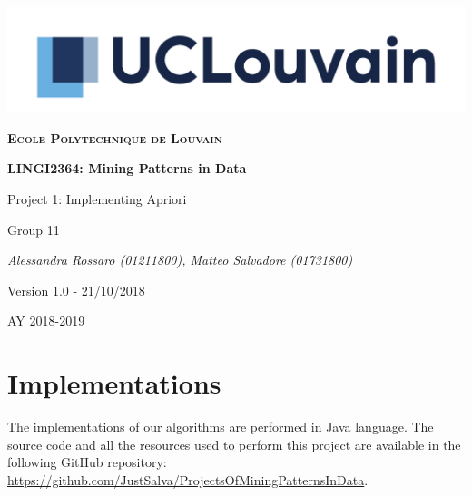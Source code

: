 \documentclass[11pt, a4paper]{article}
\begin{document}
	\begin{titlepage}
		\centering
		\includegraphics[scale =0.8]{logo.jpg}\par\vspace{1cm}
		{\scshape\LARGE\bfseries Ecole Polytechnique de Louvain\par}
		\vspace{1.5cm}
		{\scshape\Large \par}
		\vspace{1.5cm}
		{\huge\bfseries LINGI2364: Mining Patterns in Data \par}
		\vspace{1cm}
		{\Huge Project 1: Implementing Apriori \par}
		\vspace{2cm}
		{\LARGE Group 11\par}
		\vspace{1cm}
		{\Large\itshape Alessandra Rossaro (01211800), Matteo Salvadore (01731800)\par}
		\vspace{2cm}
		{\small Version 1.0 - 21/10/2018\par}

		\vfill

		{\large AY 2018-2019\par}
	\end{titlepage}

	\section{Implementations}
	The implementations of our algorithms are performed in Java language.\newline
	The source code and all the resources used to perform this project are available in the following GitHub repository: \url{https://github.com/JustSalva/ProjectsOfMiningPatternsInData}.
\end{document}
